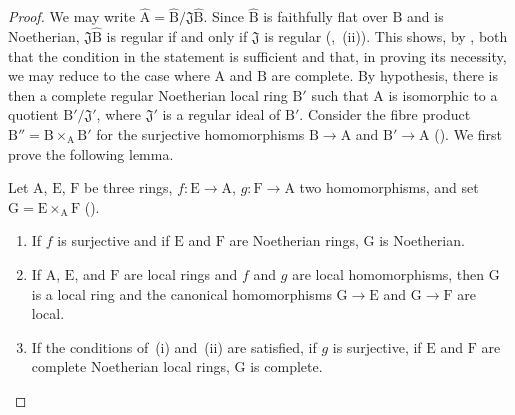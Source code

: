 \begin{proof}
We may write $\widehat{\mathrm{A}}=\widehat{\mathrm{B}}/\mathfrak{J}\widehat{\mathrm{B}}$. Since $\widehat{\mathrm{B}}$ is faithfully flat over $\mathrm{B}$ and is Noetherian, $\mathfrak{J}\widehat{\mathrm{B}}$ is regular if and only if $\mathfrak{J}$ is regular (,~(ii)).
This shows, by , both that the condition in the statement is sufficient and that, in proving its necessity, we may reduce to the case where $\mathrm{A}$ and $\mathrm{B}$ are complete.
By hypothesis, there is then a complete regular Noetherian local ring $\mathrm{B}'$ such that $\mathrm{A}$ is isomorphic to a quotient $\mathrm{B}'/\mathfrak{J}'$, where $\mathfrak{J}'$ is a regular ideal of $\mathrm{B}'$.
Consider the fibre product $\mathrm{B}''=\mathrm{B}\times_{\mathrm{A}}\mathrm{B}'$ for the surjective homomorphisms $\mathrm{B}\to\mathrm{A}$ and $\mathrm{B}'\to\mathrm{A}$ (). We first prove the following lemma.

\begin{lemma}[19.3.2.1]
\label{IV.19.3.2.1}
Let $\mathrm{A}$, $\mathrm{E}$, $\mathrm{F}$ be three rings, $f:\mathrm{E}\to\mathrm{A}$, $g:\mathrm{F}\to\mathrm{A}$ two homomorphisms, and set $\mathrm{G}=\mathrm{E}\times_{\mathrm{A}}\mathrm{F}$ ().
\begin{enumerate}[label=(\roman*)]
  \item If $f$ is surjective and if $\mathrm{E}$ and $\mathrm{F}$ are Noetherian rings, $\mathrm{G}$ is Noetherian.
  \item If $\mathrm{A}$, $\mathrm{E}$, and $\mathrm{F}$ are local rings and $f$ and $g$ are local homomorphisms, then $\mathrm{G}$ is a local ring and the canonical homomorphisms $\mathrm{G}\to\mathrm{E}$ and $\mathrm{G}\to\mathrm{F}$ are local.
  \item If the conditions of~(i) and~(ii) are satisfied, if $g$ is surjective, if $\mathrm{E}$ and $\mathrm{F}$ are complete Noetherian local rings, $\mathrm{G}$ is complete.
\end{enumerate}
\end{lemma}


\end{proof}
